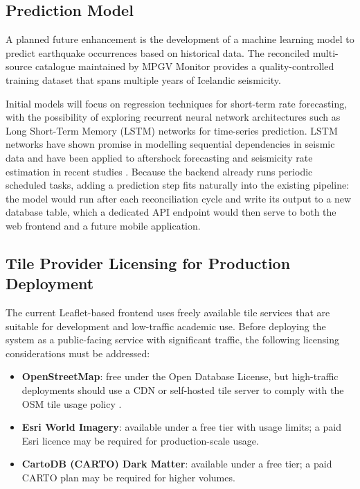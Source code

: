 \documentclass[12pt]{article}
\begin{document}
\subsection{Prediction Model}
\label{subsec:prediction_model}

A planned future enhancement is the development of a machine learning model to predict earthquake occurrences based on historical data. The reconciled multi-source catalogue maintained by MPGV Monitor provides a quality-controlled training dataset that spans multiple years of Icelandic seismicity.

Initial models will focus on regression techniques for short-term rate forecasting, with the possibility of exploring recurrent neural network architectures such as Long Short-Term Memory (LSTM) networks for time-series prediction. LSTM networks have shown promise in modelling sequential dependencies in seismic data and have been applied to aftershock forecasting and seismicity rate estimation in recent studies \cite{DeVries2018LSTM}. Because the backend already runs periodic scheduled tasks, adding a prediction step fits naturally into the existing pipeline: the model would run after each reconciliation cycle and write its output to a new database table, which a dedicated API endpoint would then serve to both the web frontend and a future mobile application.

\subsection{Tile Provider Licensing for Production Deployment}
\label{subsec:tile_licensing}

The current Leaflet-based frontend uses freely available tile services that are suitable for development and low-traffic academic use. Before deploying the system as a public-facing service with significant traffic, the following licensing considerations must be addressed:

\begin{itemize}
    \item \textbf{OpenStreetMap}: free under the Open Database License, but high-traffic deployments should use a CDN or self-hosted tile server to comply with the OSM tile usage policy \cite{OSM_TileUsage}.
    \item \textbf{Esri World Imagery}: available under a free tier with usage limits; a paid Esri licence may be required for production-scale usage.
    \item \textbf{CartoDB (CARTO) Dark Matter}: available under a free tier; a paid CARTO plan may be required for higher volumes.
\end{itemize}
\end{document}
